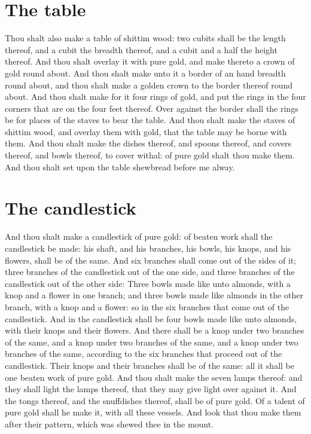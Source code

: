 \begin{biblechapter}
\section*{The table}
\verse Thou shalt also make a table of shittim wood: two cubits shall be the length thereof, and a cubit the breadth thereof, and a cubit and a half the height thereof.
\verse And thou shalt overlay it with pure gold, and make thereto a crown of gold round about.
\verse And thou shalt make unto it a border of an hand breadth round about, and thou shalt make a golden crown to the border thereof round about.
\verse And thou shalt make for it four rings of gold, and put the rings in the four corners that are on the four feet thereof.
\verse Over against the border shall the rings be for places of the staves to bear the table.
\verse And thou shalt make the staves of shittim wood, and overlay them with gold, that the table may be borne with them.
\verse And thou shalt make the dishes thereof, and spoons thereof, and covers thereof, and bowls thereof, to cover withal: of pure gold shalt thou make them.
\verse And thou shalt set upon the table shewbread before me alway.
\section*{The candlestick}
\verse And thou shalt make a candlestick of pure gold: of beaten work shall the candlestick be made: his shaft, and his branches, his bowls, his knops, and his flowers, shall be of the same.
\verse And six branches shall come out of the sides of it; three branches of the candlestick out of the one side, and three branches of the candlestick out of the other side:
\verse Three bowls made like unto almonds, with a knop and a flower in one branch; and three bowls made like almonds in the other branch, with a knop and a flower: so in the six branches that come out of the candlestick.
\verse And in the candlestick shall be four bowls made like unto almonds, with their knops and their flowers.
\verse And there shall be a knop under two branches of the same, and a knop under two branches of the same, and a knop under two branches of the same, according to the six branches that proceed out of the candlestick.
\verse Their knops and their branches shall be of the same: all it shall be one beaten work of pure gold.
\verse And thou shalt make the seven lamps thereof: and they shall light the lamps thereof, that they may give light over against it.
\verse And the tongs thereof, and the snuffdishes thereof, shall be of pure gold.
\verse Of a talent of pure gold shall he make it, with all these vessels.
\verse And look that thou make them after their pattern, which was shewed thee in the mount.
\end{biblechapter}


